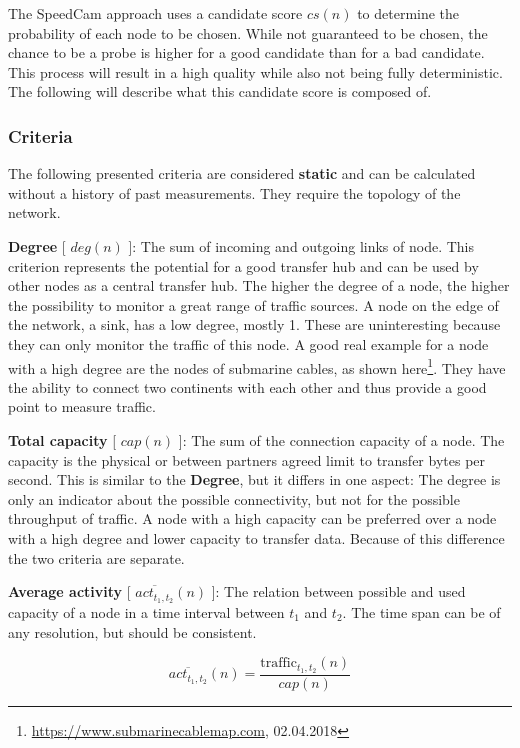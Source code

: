 \documentclass[thesis.tex]{subfiles}
\begin{document}
The SpeedCam approach uses a candidate score $cs(n)$ to determine the probability of each node to be chosen. While not guaranteed to be chosen, the chance to be a probe is higher for a good candidate than for a bad candidate. This process will result in a high quality while also not being fully deterministic. The following will describe what this candidate score is composed of.

\subsubsection{Criteria} \label{sec:main:selectionPhase:criteria}
The following presented criteria are considered \textbf{static} and can be calculated without a history of past measurements. They require the topology of the network.

\textbf{Degree} [ $deg(n)$ ]: The sum of incoming and outgoing links of node. This criterion represents the potential for a good transfer hub and can be used by other nodes as a central transfer hub. The higher the degree of a node, the higher the possibility to monitor a great range of traffic sources. A node on the edge of the network, a sink, has a low degree, mostly 1. These are uninteresting because they can only monitor the traffic of this node. A good real example for a node with a high degree are the nodes of submarine cables, as shown here\footnote{\url{https://www.submarinecablemap.com}, 02.04.2018}. They have the ability to connect two continents with each other and thus provide a good point to measure traffic.

\textbf{Total capacity} [ $cap(n)$ ]: The sum of the connection capacity of a node. The capacity is the physical or between partners agreed limit to transfer bytes per second. This is similar to the \textbf{Degree}, but it differs in one aspect: The degree is only an indicator about the possible connectivity, but not for the possible throughput of traffic. A node with a high capacity can be preferred over a node with a high degree and lower capacity to transfer data. Because of this difference the two criteria are separate.

\textbf{Average activity} [ $\overline{act_{t_1,t_2}}(n)$ ]: The relation between possible and used capacity of a node in a time interval between $t_1$ and $t_2$. The time span can be of any resolution, but should be consistent. 

\begin{equation}
\overline{act_{t_1,t_2}}(n) = \frac{\text{traffic}_{t_1,t_2}(n)}{cap(n)}
\end{equation}
\end{document}
